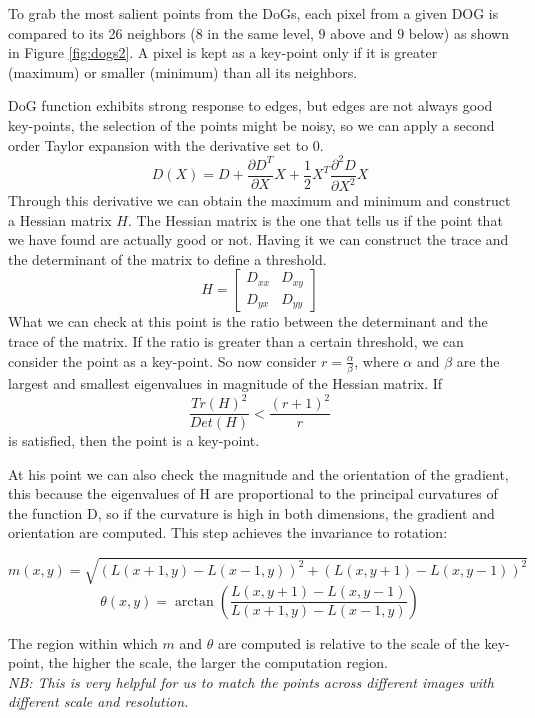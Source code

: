 To grab the most salient points from the DoGs, each pixel from a given DOG is compared to its 26 neighbors ($8$ in the same level, $9$ above and $9$ below) as shown in Figure \ref{fig:dogs2}.
A pixel is kept as a key-point only if it is greater (maximum) or smaller (minimum) than all its neighbors.
 
DoG function exhibits strong response to edges, but edges are not always good key-points, the selection of the points might be noisy, so we can apply a second order Taylor expansion with the derivative set to $0$. 
\[
    D(X)=D + \frac{\partial D^T}{\partial X}X + \frac{1}{2}X^T\frac{\partial^2D}{\partial X^2}X
\]
Through this derivative we can obtain the maximum and minimum and construct a Hessian matrix $H$.
The Hessian matrix is the one that tells us if the point that we have found are actually good or not.
Having it we can construct the trace and the determinant of the matrix to define a threshold.
\[
    H = \begin{bmatrix}
        D_{xx} & D_{xy} \\
        D_{yx} & D_{yy}
    \end{bmatrix}
\]
What we can check at this point is the ratio between the determinant and the trace of the matrix.
If the ratio is greater than a certain threshold, we can consider the point as a key-point.
So now consider $r = \frac{\alpha}{\beta}$, where $\alpha$ and $\beta$ are the largest and smallest eigenvalues in magnitude of the Hessian matrix.
If \[ \frac{Tr(H)^2}{Det(H)} < \frac{(r+1)^2}{r} \] is satisfied, then the point is a key-point.


At his point we can also check the magnitude and the orientation of the gradient, this because the eigenvalues of H are proportional to the principal curvatures of the function D, so if the curvature is high in both dimensions, the gradient and orientation are computed.
This step achieves the invariance to rotation:

\[
    m(x,y) = \sqrt{(L(x+1,y)-L(x-1,y))^2 + (L(x,y+1)-L(x,y-1))^2}  
\]
\[
    \theta(x,y) = \arctan\left(\frac{L(x,y+1)-L(x,y-1)}{L(x+1,y)-L(x-1,y)}\right)
\]

The region within which $m$ and $\theta$ are computed is relative to the scale of the key-point, the higher the scale, the larger the computation region.
\\\textit{NB: This is very helpful for us to match the points across different images with different scale and resolution.}
 
